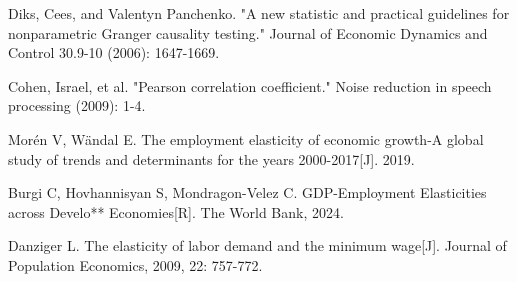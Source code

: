 \documentclass[12pt]{article}  %
\begin{document}
\clearpage   %
\begin{thebibliography}{99}
	
	Diks, Cees, and Valentyn Panchenko. "A new statistic and practical guidelines for nonparametric Granger causality testing." Journal of Economic Dynamics and Control 30.9-10 (2006): 1647-1669.

	Cohen, Israel, et al. "Pearson correlation coefficient." Noise reduction in speech processing (2009): 1-4.
	
	Morén V, Wändal E. The employment elasticity of economic growth-A global study of trends and determinants for the years 2000-2017[J]. 2019.

	
	Burgi C, Hovhannisyan S, Mondragon-Velez C. GDP-Employment Elasticities across Develo** Economies[R]. The World Bank, 2024.

	
	Danziger L. The elasticity of labor demand and the minimum wage[J]. Journal of Population Economics, 2009, 22: 757-772.
	
	

	
	

	
\end{thebibliography}


%  




\end{document}
